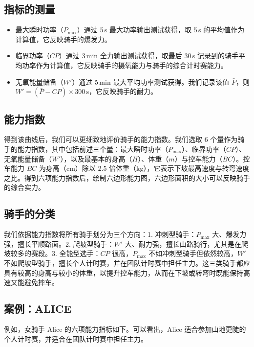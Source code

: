 \documentclass[11pt,a4paper]{ctexart}
\begin{document}
\subsection*{指标的测量}

\begin{itemize}
\item 最大瞬时功率（$P_{\max}$）通过 5\,s 最大功率输出测试获得，取 5\,s 的平均值作为计算值，它反映骑手的爆发力。
\item 临界功率（$CP$）通过 3\,min 全力输出测试获得，取最后 30\,s 记录到的骑手平均功率作为计算值，它反映骑手的摄氧能力与骑手的综合计时赛能力。
\item 无氧能量储备（$W'$）通过 5\,min 最大平均功率测试获得。我们记录该值 $\bar{P}$，则 $W'=(\bar{P}-CP)\times 300\,\mathrm{s}$，它反映骑手的耐力。
\end{itemize}

\subsection*{能力指数}

得到该曲线后，我们可以更细致地评价骑手的能力指数。我们选取 6 个量作为骑手的能力指数，其中包括前述三个量：最大瞬时功率（$P_{\max}$）、临界功率（$CP$）、无氧能量储备（$W'$），以及最基本的身高（$H$）、体重（$m$）与控车能力（$BC$）。控车能力 $BC$ 为身高（cm）除以 2.5 倍体重（kg），它表示下坡最高速度与转弯速度之比。得到六项能力指数后，绘制六边形能力图，六边形面积的大小可以反映骑手的综合实力。

\subsection*{骑手的分类}

我们依据能力指数将所有骑手划分为三个方向：1. 冲刺型骑手：$P_{\max}$ 大、爆发力强，擅长平顺路面。2. 爬坡型骑手：$W'$ 大、耐力强，擅长山路骑行，尤其是在爬坡较多的赛段。3. 全能型选手：$CP$ 很高，$P_{\max}$ 不如冲刺型骑手但依然较高，$W'$ 不如爬坡型骑手，擅长个人计时赛，并在团队计时赛中担任主力。这三类骑手都应具有较高的身高与较小的体重，以提升控车能力，从而在下坡或转弯时既能保持高速又能避免摔车。

\subsection*{案例：ALICE}

例如，女骑手 Alice 的六项能力指标如下。可以看出，Alice 适合参加山地更陡的个人计时赛，并适合在团队计时赛中担任主力。
\end{document}
